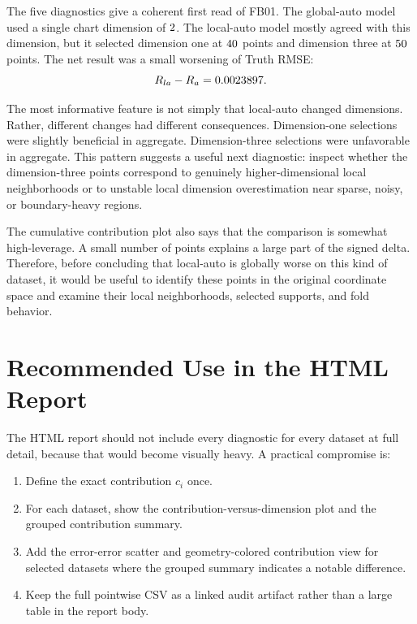 \documentclass[11pt]{article}
\begin{document}
The five diagnostics give a coherent first read of FB01.  The global-auto model
used a single chart dimension of \(2\).  The local-auto model mostly
agreed with this dimension, but it selected dimension one at \(40\)
points and dimension three at \(50\) points.  The net result was a
small worsening of Truth RMSE:
\[
  R_{la}-R_a
  =
  0.0023897.
\]

The most informative feature is not simply that local-auto changed dimensions.
Rather, different changes had different consequences.  Dimension-one selections
were slightly beneficial in aggregate.  Dimension-three selections were
unfavorable in aggregate.  This pattern suggests a useful next diagnostic:
inspect whether the dimension-three points correspond to genuinely
higher-dimensional local neighborhoods or to unstable local dimension
overestimation near sparse, noisy, or boundary-heavy regions.

The cumulative contribution plot also says that the comparison is somewhat
high-leverage.  A small number of points explains a large part of the signed
delta.  Therefore, before concluding that local-auto is globally worse on this
kind of dataset, it would be useful to identify these points in the original
coordinate space and examine their local neighborhoods, selected supports, and
fold behavior.

\section{Recommended Use in the HTML Report}

The HTML report should not include every diagnostic for every dataset at full
detail, because that would become visually heavy.  A practical compromise is:

\begin{enumerate}[leftmargin=*]
  \item Define the exact contribution \(c_i\) once.
  \item For each dataset, show the contribution-versus-dimension plot and the
  grouped contribution summary.
  \item Add the error-error scatter and geometry-colored contribution view for
  selected datasets where the grouped summary indicates a notable difference.
  \item Keep the full pointwise CSV as a linked audit artifact rather than a
  large table in the report body.
\end{enumerate}
\end{document}
